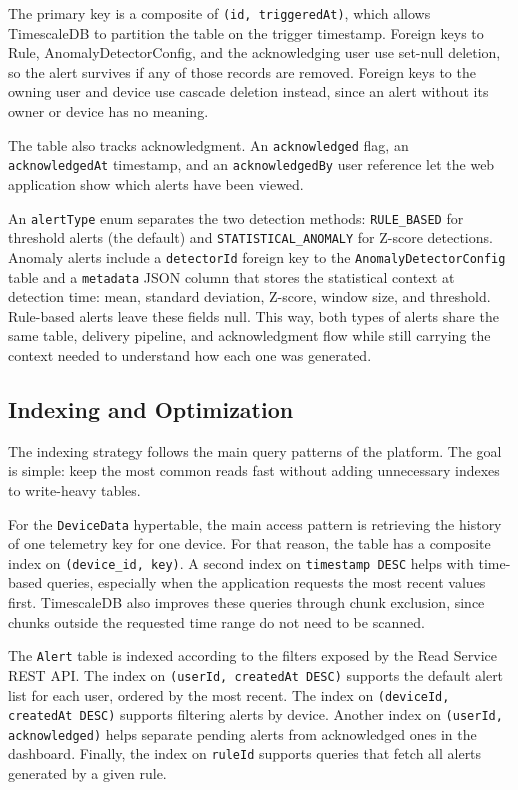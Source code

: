 The primary key is a composite of \texttt{(id, triggeredAt)}, which allows TimescaleDB to partition the table on the trigger timestamp. Foreign keys to Rule, AnomalyDetectorConfig, and the acknowledging user use set-null deletion, so the alert survives if any of those records are removed. Foreign keys to the owning user and device use cascade deletion instead, since an alert without its owner or device has no meaning.

The table also tracks acknowledgment. An \texttt{acknowledged} flag, an \texttt{acknowledgedAt} timestamp, and an \texttt{acknowledgedBy} user reference let the web application show which alerts have been viewed.

An \texttt{alertType} enum separates the two detection methods: \texttt{RULE\_BASED} for threshold alerts (the default) and \texttt{STATISTICAL\_ANOMALY} for Z-score detections. Anomaly alerts include a \texttt{detectorId} foreign key to the \texttt{AnomalyDetectorConfig} table and a \texttt{metadata} \gls{JSON} column that stores the statistical context at detection time: mean, standard deviation, Z-score, window size, and threshold. Rule-based alerts leave these fields null. This way, both types of alerts share the same table, delivery pipeline, and acknowledgment flow while still carrying the context needed to understand how each one was generated.

\subsection{Indexing and Optimization}
The indexing strategy follows the main query patterns of the platform. The goal is simple: keep the most common reads fast without adding unnecessary indexes to write-heavy tables.

For the \texttt{DeviceData} hypertable, the main access pattern is retrieving the history of one telemetry key for one device. For that reason, the table has a composite index on \texttt{(device\_id, key)}. A second index on \texttt{timestamp DESC} helps with time-based queries, especially when the application requests the most recent values first. TimescaleDB also improves these queries through chunk exclusion, since chunks outside the requested time range do not need to be scanned.

The \texttt{Alert} table is indexed according to the filters exposed by the Read Service \gls{REST} \gls{API}. The index on \texttt{(userId, createdAt DESC)} supports the default alert list for each user, ordered by the most recent. The index on \texttt{(deviceId, createdAt DESC)} supports filtering alerts by device. Another index on \texttt{(userId, acknowledged)} helps separate pending alerts from acknowledged ones in the dashboard. Finally, the index on \texttt{ruleId} supports queries that fetch all alerts generated by a given rule.

